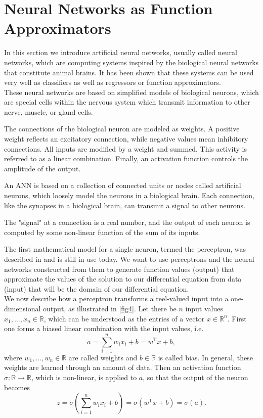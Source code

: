 \section{Neural Networks as Function Approximators}
\label{ch1:sec3}

In this section we introduce artificial neural networks, usually called neural networks, which are computing systems inspired by the biological neural networks that constitute animal brains. It has been shown that these systems can be used very well as classifiers as well as regressors or function approximators. \\
These neural networks are based on simplified models of biological neurons, which are special cells within the nervous system which transmit information to other nerve, muscle, or gland cells. 

The connections of the biological neuron are modeled as
weights. A positive weight reflects an excitatory connection, while negative values mean
inhibitory connections. All inputs are modified by a weight and summed. This activity is
referred to as a linear combination. Finally, an activation function controls the amplitude of the
output.

An ANN is based on a collection of connected units or nodes called artificial neurons, which loosely model the neurons in a biological brain. Each connection, like the synapses in a biological brain, can transmit a signal to other neurons.

The "signal" at a connection is a real number, and the output of each neuron is computed by some non-linear function of the sum of its inputs.

The first mathematical model for a single neuron, termed the perceptron, was described in \cite{Rosenblatt:1958} and is still in use today. We want to use perceptrons and the neural networks constructed from them to generate function values (output) that approximate the values of the solution to our differential equation from data (input) that will be the domain of our differential equation. \\
We now describe how a perceptron transforms a reel-valued input into a one-dimensional output, as illustrated in \cref{fig4}. Let there be $n$ input values $x_1, \ldots, x_n \in \mathbb{R}$, which can be understood as the entries of a vector $x \in \mathbb{R}^n$. First one forms a biased linear combination with the input values, i.e. 
\begin{equation*}
    a = \sum^{n}_{i=1} w_i x_i + b = w^{\mathrm{T}} x + b,
\end{equation*}
where $w_1, \ldots, w_n \in \mathbb{R}$ are called weights and $b \in \mathbb{R}$ is called bias. In general, these weights are learned through an amount of data. Then an activation function $\sigma \colon \mathbb{R} \to \mathbb{R}$, which is non-linear, is applied to $a$, so that the output of the neuron becomes
\begin{equation*}
    z = \sigma(\sum^{n}_{i=1} w_i x_i + b) = \sigma(w^{\mathrm{T}} x + b) = \sigma(a).
\end{equation*}

